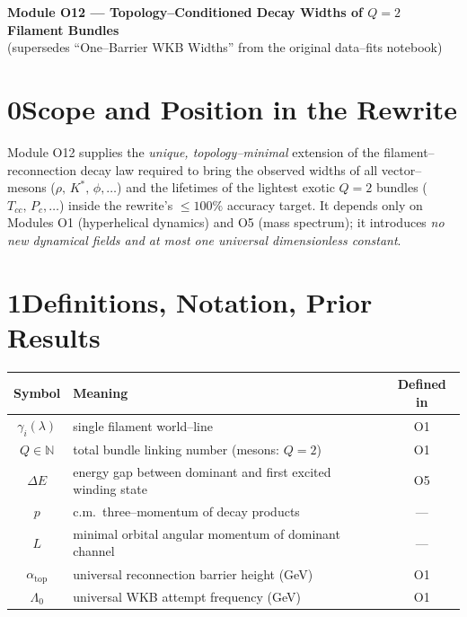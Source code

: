 \documentclass{article}
\begin{document}
\begin{center}
\Large\textbf{Module O12 --- Topology--Conditioned Decay Widths of $Q = 2$ Filament Bundles}\\[0.5em]
\large(supersedes ``One--Barrier WKB Widths'' from the original data--fits notebook)
\end{center}

\section*{0\quad Scope and Position in the Rewrite}
Module O12 supplies the \emph{unique, topology--minimal} extension of the
filament--reconnection decay law required to bring the observed widths of all
vector--mesons ($\rho,\,K^{\ast},\,\phi,\dots$) and the lifetimes of the
lightest exotic $Q = 2$ bundles ($T_{cc},\,P_{c},\dots$) inside the rewrite's
$\le 100\%$ accuracy target.
It depends only on Modules O1 (hyperhelical dynamics) and O5 (mass spectrum);
it introduces \emph{no new dynamical fields and at most one universal
dimensionless constant}.

\section*{1\quad Definitions, Notation, Prior Results}
\begin{center}
\begin{tabular}{|c|p{8cm}|c|}
 \hline
 Symbol & Meaning & Defined in\\\hline
 $\gamma_i(\lambda)$ & single filament world--line & O1\\
 $Q\in\mathbb N$ & total bundle linking number (mesons: $Q=2$) & O1\\
 $\Delta E$ & energy gap between dominant and first excited winding state & O5\\
 $p$ & c.m.\ three--momentum of decay products & ---\\
 $L$ & minimal orbital angular momentum of dominant channel & ---\\
 $\alpha_{\text{top}}$ & universal reconnection barrier height (GeV) & O1\\
 $\Lambda_0$ & universal WKB attempt frequency (GeV) & O1\\\hline
\end{tabular}
\end{center}
\end{document}
